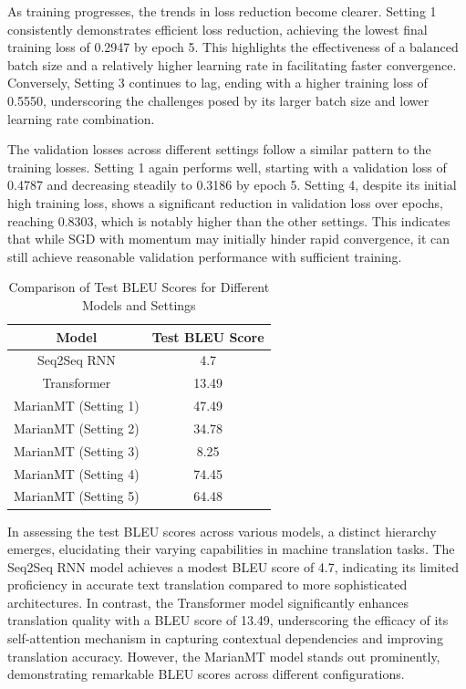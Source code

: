 \documentclass{article}
\begin{document}
As training progresses, the trends in loss reduction become clearer. Setting 1 consistently demonstrates efficient loss reduction, achieving the lowest final training loss of 0.2947 by epoch 5. This highlights the effectiveness of a balanced batch size and a relatively higher learning rate in facilitating faster convergence. Conversely, Setting 3 continues to lag, ending with a higher training loss of 0.5550, underscoring the challenges posed by its larger batch size and lower learning rate combination.

The validation losses across different settings follow a similar pattern to the training losses. Setting 1 again performs well, starting with a validation loss of 0.4787 and decreasing steadily to 0.3186 by epoch 5. Setting 4, despite its initial high training loss, shows a significant reduction in validation loss over epochs, reaching 0.8303, which is notably higher than the other settings. This indicates that while SGD with momentum may initially hinder rapid convergence, it can still achieve reasonable validation performance with sufficient training.

\begin{table}[H]
\centering
\begin{tabular}{|c|c|}
\hline
\textbf{Model} & \textbf{Test BLEU Score} \\
\hline
Seq2Seq RNN & 4.7 \\
Transformer & 13.49 \\
MarianMT (Setting 1) & 47.49 \\
MarianMT (Setting 2) & 34.78 \\
MarianMT (Setting 3) & 8.25 \\
MarianMT (Setting 4) & 74.45 \\
MarianMT (Setting 5) & 64.48 \\
\hline
\end{tabular}
\caption{Comparison of Test BLEU Scores for Different Models and Settings}
\label{table:test_bleu_scores}
\end{table}


In assessing the test BLEU scores across various models, a distinct hierarchy emerges, elucidating their varying capabilities in machine translation tasks. The Seq2Seq RNN model achieves a modest BLEU score of 4.7, indicating its limited proficiency in accurate text translation compared to more sophisticated architectures. In contrast, the Transformer model significantly enhances translation quality with a BLEU score of 13.49, underscoring the efficacy of its self-attention mechanism in capturing contextual dependencies and improving translation accuracy. However, the MarianMT model stands out prominently, demonstrating remarkable BLEU scores across different configurations.
\end{document}
